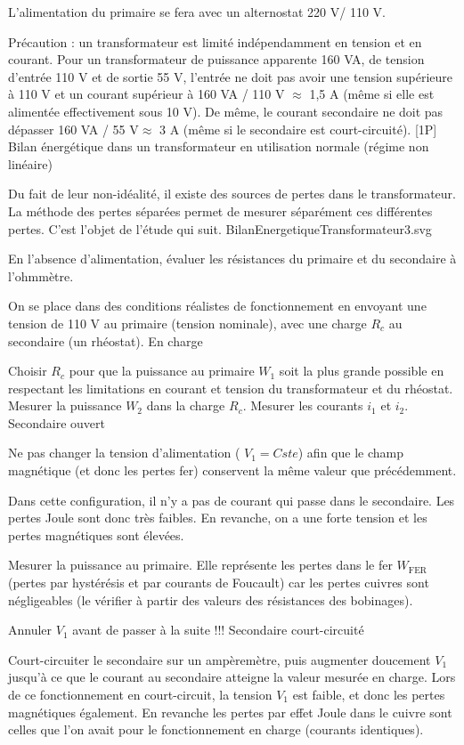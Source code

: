 \documentclass{article}%
\begin{document}
L'alimentation du primaire se fera avec un alternostat 220 V/ 110 V.

Précaution : un transformateur est limité indépendamment en tension et en courant. Pour un transformateur de puissance apparente 160 VA, de tension d'entrée 110 V et de sortie 55 V, l'entrée ne doit pas avoir une tension supérieure à 110 V et un courant supérieur à 160 VA / 110 V $\approx$ 1,5 A (même si elle est alimentée effectivement sous 10 V). De même, le courant secondaire ne doit pas dépasser 160 VA / 55 V$\approx$ 3 A (même si le secondaire est court-circuité).
[1P] Bilan énergétique dans un transformateur en utilisation normale (régime non linéaire)

Du fait de leur non-idéalité, il existe des sources de pertes dans le transformateur. La méthode des pertes séparées permet de mesurer séparément ces différentes pertes. C'est l'objet de l'étude qui suit.
BilanEnergetiqueTransformateur3.svg

En l'absence d'alimentation, évaluer les résistances du primaire et du secondaire à l'ohmmètre.

On se place dans des conditions réalistes de fonctionnement en envoyant une tension de 110 V au primaire (tension nominale), avec une charge $R_c$ au secondaire (un rhéostat).
En charge

Choisir $R_{c}$ pour que la puissance au primaire $W_{1}$ soit la plus grande possible en respectant les limitations en courant et tension du transformateur et du rhéostat. Mesurer la puissance $W_{2}$ dans la charge $R_{c}$. Mesurer les courants $i_{1}$ et $i_{2}$.
Secondaire ouvert

Ne pas changer la tension d'alimentation ( $V_{1} = Cste$) afin que le champ magnétique (et donc les pertes fer) conservent la même valeur que précédemment.

Dans cette configuration, il n'y a pas de courant qui passe dans le secondaire. Les pertes Joule sont donc très faibles. En revanche, on a une forte tension et les pertes magnétiques sont élevées.

Mesurer la puissance au primaire. Elle représente les pertes dans le fer $W_{\mbox{FER}}$ (pertes par hystérésis et par courants de Foucault) car les pertes cuivres sont négligeables (le vérifier à partir des valeurs des résistances des bobinages).

Annuler $V_1$ avant de passer à la suite !!!
Secondaire court-circuité

Court-circuiter le secondaire sur un ampèremètre, puis augmenter doucement $V_1$ jusqu'à ce que le courant au secondaire atteigne la valeur mesurée en charge. Lors de ce fonctionnement en court-circuit, la tension $V_1$ est faible, et donc les pertes magnétiques également. En revanche les pertes par effet Joule dans le cuivre sont celles que l'on avait pour le fonctionnement en charge (courants identiques).
\end{document}
